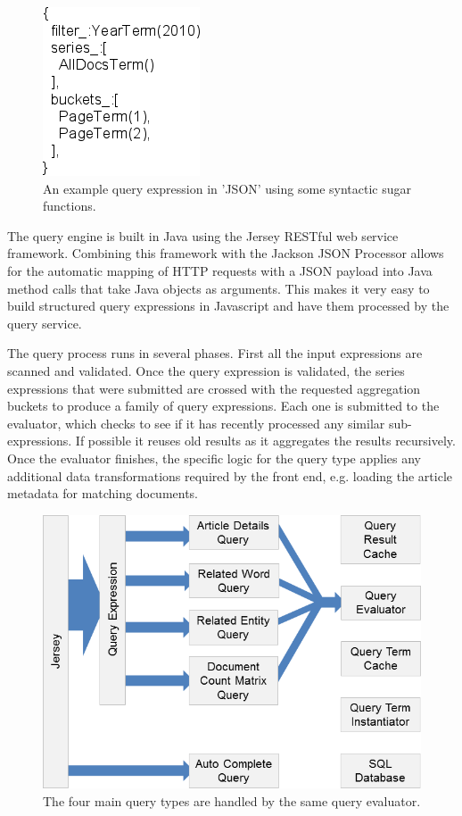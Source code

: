 \begin{figure}[htb]
  \centerline{
    \includegraphics[scale=0.28]{figures/json-query.png}
  }
  \caption{An example query expression in 'JSON' using some syntactic sugar functions.}
  \label{fig:json-query}
\end{figure}

The query engine is built in Java using the Jersey RESTful web service framework.  Combining this framework with the Jackson JSON Processor allows for the automatic mapping of HTTP requests with a JSON payload into Java method calls that take Java objects as arguments.  This makes it very easy to build structured query expressions in Javascript and have them processed by the query service.

The query process runs in several phases.  First all the input expressions are scanned and validated.  Once the query expression is validated, the series expressions that were submitted are crossed with the requested aggregation buckets to produce a family of query expressions.  Each one is submitted to the evaluator, which checks to see if it has recently processed any similar sub-expressions. If possible it reuses old results as it aggregates the results recursively.  Once the evaluator finishes, the specific logic for the query type applies any additional data transformations required by the front end, e.g. loading the article metadata for matching documents.

\begin{figure}[htb]
  \centerline{
    \includegraphics[scale=0.28]{figures/query.png}
  }
  \caption{The four main query types are handled by the same query evaluator.}
  \label{fig:query}
\end{figure}

